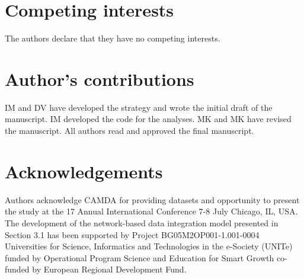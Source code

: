\documentclass{bmcart}
\begin{document}
\begin{backmatter}
\section*{Competing interests}
  The authors declare that they have no competing interests.

\section*{Author's contributions}
IM and DV have developed the strategy and wrote
the initial draft of the manuscript. IM developed the code for the
analyses. MK and MK have revised the manuscript. All authors read and
approved the final manuscript. 

\section*{Acknowledgements}
Authors acknowledge CAMDA for providing datasets and opportunity to present the
study at the 17 Annual International Conference 7-8 July Chicago, IL, USA.  The
development of the network-based data integration model presented in Section	
3.1 has been supported by Project BG05M2OP001-1.001-0004 Universities for
Science, Informatics and Technologies in the e-Society (UNITe) funded by
Operational Program Science and Education for Smart Growth co-funded by
European Regional Development Fund.





\end{backmatter}
\end{document}
